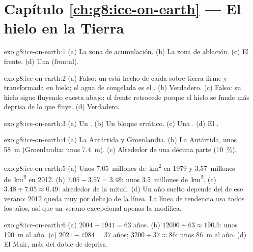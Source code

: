 \section*{Capítulo \ref{ch:g8:ice-on-earth} --- El hielo en la Tierra}

\begin{solution}{exo:g8:ice-on-earth:1}
(a) La zona de acumulación. (b) La zona de ablación. (c) El frente. (d) Una
 (frontal).
\end{solution}

\begin{solution}{exo:g8:ice-on-earth:2}
(a) Falso: un  está hecho de  caída sobre tierra firme y
transformada en hielo; el agua de  congelada es el .
(b) Verdadero. (c) Falso: su hielo sigue fluyendo cuesta abajo; el frente
retrocede porque el hielo se funde más deprisa de lo que fluye.
(d) Verdadero.
\end{solution}

\begin{solution}{exo:g8:ice-on-earth:3}
(a) Un . (b) Un bloque errático. (c) Una . (d) El .
\end{solution}

\begin{solution}{exo:g8:ice-on-earth:4}
(a) La Antártida y Groenlandia. (b) La Antártida, unos \qty{58}{m}
(Groenlandia: unos \qty{7.4}{m}). (c) Alrededor de una décima parte (10~\%).
\end{solution}

\begin{solution}{exo:g8:ice-on-earth:5}
(a) Unos \num{7.05}~millones de~\unit{km^2} en 1979 y
\num{3.57}~millones de~\unit{km^2} en 2012. (b) $7.05 - 3.57 = 3.48$: unos
\num{3.5}~millones de~\unit{km^2}. (c) $3.48 \div 7.05 \approx 0.49$:
alrededor de la mitad. (d) Un año suelto depende del  de ese verano:
2012 queda muy por debajo de la línea. La línea de tendencia usa todos los
años, así que un verano excepcional apenas la modifica.
\end{solution}

\begin{solution}{exo:g8:ice-on-earth:6}
(a) $2004 - 1941 = 63$ años. (b) $12000 \div 63 \approx 190.5$: unos
\qty{190}{m} al año. (c) $2021 - 1984 = 37$ años; $3200 \div 37 \approx
86$: unos \qty{86}{m} al año. (d) El  Muir, más del doble de
deprisa.
\end{solution}

